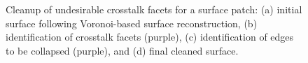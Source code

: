 \begin{figure}[b!]
{\label{fig:cross1-2}}
%
\caption{Cleanup of undesirable crosstalk facets for a surface patch: (a) initial surface following Voronoi-based surface reconstruction, (b) identification of crosstalk facets (purple), (c) identification of edges to be collapsed (purple), and (d) final cleaned surface.}
\label{fig:cross1}
\end{figure}

